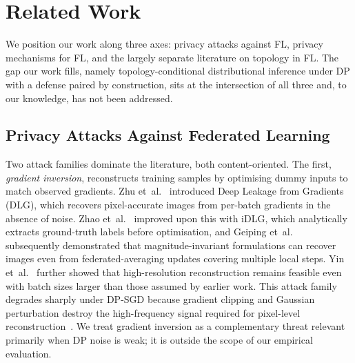 \documentclass[letterpaper,journal]{IEEEtran}
\begin{document}
\section{Related Work}
\label{sec:related}

We position our work along three axes: privacy attacks against FL,
privacy mechanisms for FL, and the largely separate literature on
topology in FL. The gap our work fills, namely topology-conditional
distributional inference under DP with a defense paired by construction,
sits at the intersection of all three and, to our knowledge, has
not been addressed.

\subsection{Privacy Attacks Against Federated Learning}
\label{sec:related-attacks}

Two attack families dominate the literature, both content-oriented.
The first, \textit{gradient inversion}, reconstructs training samples
by optimising dummy inputs to match observed gradients. Zhu et~al.~\cite{zhu2019dlg}
introduced Deep Leakage from Gradients (DLG), which recovers
pixel-accurate images from per-batch gradients in the absence of
noise. Zhao et~al.~\cite{zhao2020idlg} improved upon this with iDLG,
which analytically extracts ground-truth labels before optimisation,
and Geiping et~al.~\cite{geiping2020inverting} subsequently
demonstrated that magnitude-invariant formulations can recover images
even from federated-averaging updates covering multiple local steps.
Yin et~al.~\cite{yin2021gradinversion} further showed that
high-resolution reconstruction remains feasible even with batch sizes
larger than those assumed by earlier work. This attack family degrades
sharply under DP-SGD because gradient clipping and Gaussian
perturbation destroy the high-frequency signal required for
pixel-level reconstruction~\cite{fowl2022robbing}. We treat gradient inversion as a
complementary threat relevant primarily when DP noise is weak; it is
outside the scope of our empirical evaluation.
\end{document}
